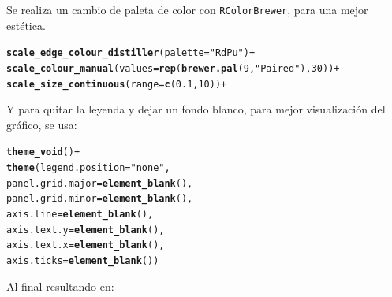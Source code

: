 \documentclass{article}\usepackage[]{graphicx}\usepackage[]{color}
\makeatletter
\newcommand{\hlstr}[1]{\textcolor[rgb]{0.192,0.494,0.8}{#1}}%
\newcommand{\hlopt}[1]{\textcolor[rgb]{0,0,0}{#1}}%
\newcommand{\hlstd}[1]{\textcolor[rgb]{0.345,0.345,0.345}{#1}}%
\newcommand{\hlkwc}[1]{\textcolor[rgb]{0.333,0.667,0.333}{#1}}%
\newcommand{\hlkwd}[1]{\textcolor[rgb]{0.737,0.353,0.396}{\textbf{#1}}}%
\newenvironment{kframe}{%
 \def\at@end@of@kframe{}%
 \ifinner\ifhmode%
  \def\at@end@of@kframe{\end{minipage}}%
  \begin{minipage}{\columnwidth}%
 \fi\fi%
 \def\FrameCommand##1{\hskip\@totalleftmargin \hskip-\fboxsep
 \colorbox{shadecolor}{##1}\hskip-\fboxsep
     \hskip-\linewidth \hskip-\@totalleftmargin \hskip\columnwidth}%
 \MakeFramed {\advance\hsize-\width
   \@totalleftmargin\z@ \linewidth\hsize
   \@setminipage}}%
 {\par\unskip\endMakeFramed%
 \at@end@of@kframe}
\newenvironment{knitrout}{}{} %
\makeatother
\begin{document}
Se realiza un cambio de paleta de color con \texttt{RColorBrewer}, para una mejor est\'etica.
\begin{knitrout}
\color{fgcolor}\begin{kframe}
\begin{alltt}
  \hlkwd{scale_edge_colour_distiller}(palette = \hlstr{"RdPu"}) +
  \hlkwd{scale_colour_manual}(values= \hlkwd{rep}( \hlkwd{brewer.pal}(9,\hlstr{"Paired"}) , 30)) +
  \hlkwd{scale_size_continuous}( range = \hlkwd{c}(0.1,10) ) +
\end{alltt}
\end{kframe}
\end{knitrout}
\clearpage
Y para quitar la leyenda y dejar un fondo blanco, para mejor visualizaci\'on del gr\'afico, se usa:
\begin{knitrout}
\color{fgcolor}\begin{kframe}
\begin{alltt}
  \hlkwd{theme_void}\hlstd{()} \hlopt{+}
  \hlkwd{theme}\hlstd{(}\hlkwc{legend.position} \hlstd{=} \hlstr{"none"}\hlstd{,}
        \hlkwc{panel.grid.major} \hlstd{=} \hlkwd{element_blank}\hlstd{(),}
        \hlkwc{panel.grid.minor} \hlstd{=} \hlkwd{element_blank}\hlstd{(),}
        \hlkwc{axis.line} \hlstd{=} \hlkwd{element_blank}\hlstd{(),}
        \hlkwc{axis.text.y} \hlstd{=} \hlkwd{element_blank}\hlstd{(),}
        \hlkwc{axis.text.x} \hlstd{=} \hlkwd{element_blank}\hlstd{(),}
        \hlkwc{axis.ticks} \hlstd{=} \hlkwd{element_blank}\hlstd{())}
\end{alltt}
\end{kframe}
\end{knitrout}
Al final resultando en:
\end{document}
